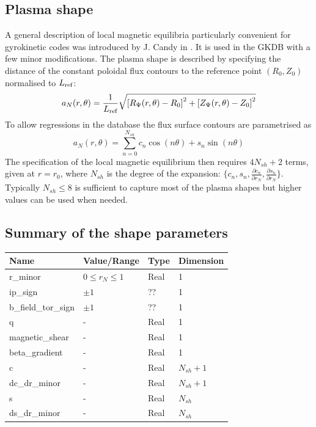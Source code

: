 \documentclass[fleqn]{report}
\begin{document}
\subsection{Plasma shape}
A general description of local magnetic equilibria particularly convenient for gyrokinetic codes was introduced by J. Candy in \cite {Candy:PPCF2009}. It is used in the GKDB with a few minor modifications.
The plasma shape is described by specifying the distance of the constant poloidal flux contours to the reference point $(R_0,Z_0)$  normalised to $L_{\textrm{ref}}$:
\begin{equation}
 a_N(r,\theta) = \frac{1}{L_{\textrm{ref}}}\sqrt{\left[R_{\Psi}(r,\theta)-R_0\right]^2 + \left[Z_{\Psi}(r,\theta)-Z_0\right]^2}
\end{equation}
To allow regressions in the database the flux surface contours are parametrised as 
\begin{equation}
 a_N(r,\theta) = \sum_{n=0}^{N_{sh}} c_n \cos(n\theta) + s_n \sin(n\theta)
\end{equation}
The specification of the local magnetic equilibrium then requires $4N_{sh}+2$ terms, given at $r=r_0$, where $N_{sh}$ is the degree of the expansion: $\{c_n,s_n,\frac{\partial c_n}{\partial r_N},\frac{\partial s_n}{\partial r_N}\}$. Typically $N_{sh}\leq8$ is sufficient to capture most of the plasma shapes but higher values can be used when needed.

\subsection{Summary of the shape parameters}
\begin{tabularx}{\textwidth}{|X|Y|Y|Y|}
\hline
Name & Value/Range & Type & Dimension \\
\hline
r\_minor & $0\leq r_N \leq 1$ & Real & 1 \\
ip\_sign & $\pm 1$ & ?? & 1 \\
b\_field\_tor\_sign & $\pm 1$ & ?? & 1 \\
q & - & Real & 1 \\
magnetic\_shear & - & Real & 1 \\
beta\_gradient & - & Real & 1 \\
c & - & Real & $N_{sh}+1$ \\
dc\_dr\_minor & - & Real & $N_{sh}+1$ \\
s & - & Real & $N_{sh}$ \\
ds\_dr\_minor & - & Real & $N_{sh}$ \\
\hline
\end{tabularx}
\end{document}
